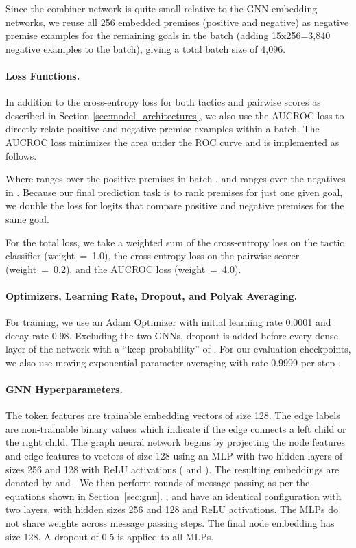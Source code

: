 \documentclass[letterpaper]{article} \usepackage{aaai20}  \usepackage{times}  \usepackage{helvet} \usepackage{courier}  \usepackage[hyphens]{url}  \usepackage{graphicx} \urlstyle{rm} \def\UrlFont{\rm}  \usepackage{graphicx}  \frenchspacing  \setlength{\pdfpagewidth}{8.5in}  \setlength{\pdfpageheight}{11in}
\newcommand{\citep}{\cite}
\begin{document}
Since the combiner network is quite small relative to the GNN embedding networks, we reuse all 256 embedded premises (positive and negative) as negative premise examples for the remaining goals in the batch (adding 15x256=3,840 negative examples to the batch), giving a total batch size of 4,096. 

\paragraph{Loss Functions.}
In addition to the cross-entropy loss for both tactics and pairwise scores as described in Section \ref{sec:model_architectures}, we also use the AUCROC loss \citep{burges2005learning,eban2016scalable} to directly relate positive and negative premise examples within a batch.
The AUCROC loss minimizes the area under the ROC curve and is implemented as follows.

 Where  ranges over the positive premises in batch , and  ranges over the negatives in .  Because our final prediction task is to rank premises for just one given goal, we double the loss for logits that compare positive and negative premises for the same goal.

For the total loss, we take a weighted sum of the cross-entropy loss on the tactic classifier (weight~=~1.0), the cross-entropy loss on the pairwise scorer (weight~=~0.2), and the AUCROC loss (weight~=~4.0).

\paragraph{Optimizers, Learning Rate, Dropout, and Polyak Averaging.}
For training, we use an Adam Optimizer \citep{kingma2014adam} with initial learning rate 0.0001 and decay rate 0.98. Excluding the two GNNs, dropout is added before every dense layer of the network with a ``keep probability'' of .
For our evaluation checkpoints, we also use moving exponential parameter averaging with rate 0.9999 per step \citep{polyak1990new,polyak1992acceleration}.

\paragraph{GNN Hyperparameters.}
The token features  are trainable embedding vectors of size 128. The edge labels  are non-trainable binary values  which indicate if the edge connects a left child or the right child.
The graph neural network begins by projecting the node features  and edge features  to vectors of size 128 using an MLP with two hidden layers of sizes 256 and 128 with ReLU activations ( and ). The resulting embeddings are denoted by  and .
We then perform  rounds of message passing as per the equations shown in Section~\ref{sec:gnn}. ,  and  have an identical configuration with two layers, with hidden sizes 256 and 128 and ReLU activations. The MLPs do not share weights across message passing steps.
The final node embedding has size 128.
A dropout of 0.5 is applied to all MLPs.
\end{document}
